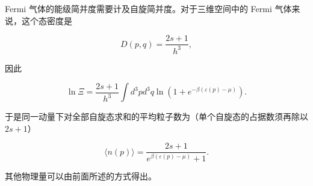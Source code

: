 Fermi 气体的能级简并度需要计及自旋简并度。对于三维空间中的 Fermi 气体来说，这个态密度是
\begin{linenomath}\begin{equation}
    D(p,q) = \frac{2s+1}{h^3},
\end{equation}\end{linenomath}
因此
\begin{linenomath}\begin{equation}
    \ln \varXi = \frac{2s+1}{h^3}\int d^3p d^3 q \ln \left( 1 + e^{-\beta(\varepsilon(p) - \mu)} \right).
\end{equation}\end{linenomath}
于是同一动量下对全部自旋态求和的平均粒子数为（单个自旋态的占据数须再除以 $2s+1$）
\begin{linenomath}\begin{equation}
    \langle n(p) \rangle = \frac{2s+1}{e^{\beta(\varepsilon(p) - \mu)} + 1}.
\end{equation}\end{linenomath}
其他物理量可以由前面所述的方式得出。
